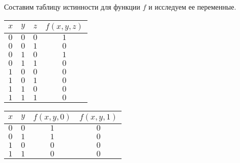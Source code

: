 \documentclass[12pt]{article}
\begin{document}
\begin{enumerate}[label={\textbf{\arabic{section}.\arabic*}}]
\begin{enumerate}[label=\textbf{\alph*)}]
			Составим таблицу истинности для функции $f$ и исследуем ее переменные.
			
			\begin{minipage}{0.5\linewidth}
				\centering
				\begin{tabular}{|c|c|c|c|} \hline
					$x$ & $y$ & $z$ & $f(x, y, z)$ \\ \hline
					$0$ & $0$ & $0$ & $1$ \\
					$0$ & $0$ & $1$ & $0$ \\
					$0$ & $1$ & $0$ & $1$ \\
					$0$ & $1$ & $1$ & $0$ \\
					$1$ & $0$ & $0$ & $0$ \\
					$1$ & $0$ & $1$ & $0$ \\
					$1$ & $1$ & $0$ & $0$ \\
					$1$ & $1$ & $1$ & $0$ \\ \hline
				\end{tabular}
				\label{table1.2.1}
			\end{minipage}
			\hfill
			\begin{minipage}{0.49\linewidth}
				\centering
				\begin{tabular}{|c|c|c|c|} \hline
					$x$ & $y$ & $f(x, y, 0)$ & $f(x, y, 1)$ \\ \hline
					$0$ & $0$ & $1$ & $0$ \\
					$0$ & $1$ & $1$ & $0$ \\
					$1$ & $0$ & $0$ & $0$ \\
					$1$ & $1$ & $0$ & $0$ \\ \hline
				\end{tabular}
				\label{table1.2.2}
			\end{minipage}\\
			

\end{enumerate}
\end{enumerate}
\end{document}
